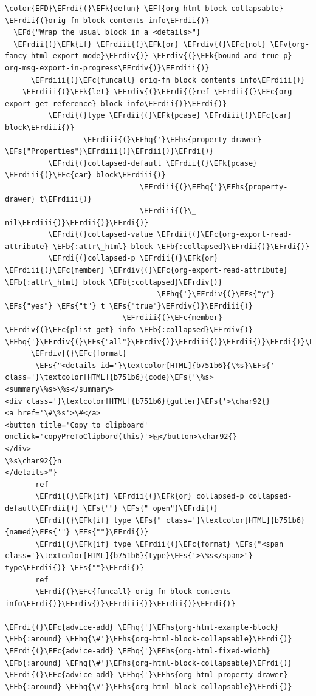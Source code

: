 \documentclass{scrartcl}
\newcommand{\EFk}[1]{\textcolor{EFk}{#1}} %
\newcommand{\EFd}[1]{\textcolor{EFd}{\textit{#1}}} %
\newcommand{\EFs}[1]{\textcolor{EFs}{#1}} %
\newcommand{\EFb}[1]{\textcolor{EFb}{#1}} %
\newcommand{\EFc}[1]{\textcolor{EFc}{#1}} %
\newcommand{\EFv}[1]{\textcolor{EFv}{#1}} %
\newcommand{\EFf}[1]{\textcolor{EFf}{#1}} %
\newcommand{\EFhq}[1]{\textcolor{EFhq}{#1}} %
\newcommand{\EFhs}[1]{\textcolor{EFhs}{#1}} %
\newcommand{\EFrdi}[1]{\textcolor{EFrdi}{#1}} %
\newcommand{\EFrdii}[1]{\textcolor{EFrdii}{#1}} %
\newcommand{\EFrdiii}[1]{\textcolor{EFrdiii}{#1}} %
\newcommand{\EFrdiv}[1]{\textcolor{EFrdiv}{#1}} %
\begin{document}
\begin{Code}
\begin{Verbatim}[]
\color{EFD}\EFrdi{(}\EFk{defun} \EFf{org-html-block-collapsable} \EFrdii{(}orig-fn block contents info\EFrdii{)}
  \EFd{"Wrap the usual block in a <details>"}
  \EFrdii{(}\EFk{if} \EFrdiii{(}\EFk{or} \EFrdiv{(}\EFc{not} \EFv{org-fancy-html-export-mode}\EFrdiv{)} \EFrdiv{(}\EFk{bound-and-true-p} org-msg-export-in-progress\EFrdiv{)}\EFrdiii{)}
      \EFrdiii{(}\EFc{funcall} orig-fn block contents info\EFrdiii{)}
    \EFrdiii{(}\EFk{let} \EFrdiv{(}\EFrdi{(}ref \EFrdii{(}\EFc{org-export-get-reference} block info\EFrdii{)}\EFrdi{)}
          \EFrdi{(}type \EFrdii{(}\EFk{pcase} \EFrdiii{(}\EFc{car} block\EFrdiii{)}
                  \EFrdiii{(}\EFhq{'}\EFhs{property-drawer} \EFs{"Properties"}\EFrdiii{)}\EFrdii{)}\EFrdi{)}
          \EFrdi{(}collapsed-default \EFrdii{(}\EFk{pcase} \EFrdiii{(}\EFc{car} block\EFrdiii{)}
                               \EFrdiii{(}\EFhq{'}\EFhs{property-drawer} t\EFrdiii{)}
                               \EFrdiii{(}\_ nil\EFrdiii{)}\EFrdii{)}\EFrdi{)}
          \EFrdi{(}collapsed-value \EFrdii{(}\EFc{org-export-read-attribute} \EFb{:attr\_html} block \EFb{:collapsed}\EFrdii{)}\EFrdi{)}
          \EFrdi{(}collapsed-p \EFrdii{(}\EFk{or} \EFrdiii{(}\EFc{member} \EFrdiv{(}\EFc{org-export-read-attribute} \EFb{:attr\_html} block \EFb{:collapsed}\EFrdiv{)}
                                   \EFhq{'}\EFrdiv{(}\EFs{"y"} \EFs{"yes"} \EFs{"t"} t \EFs{"true"}\EFrdiv{)}\EFrdiii{)}
                           \EFrdiii{(}\EFc{member} \EFrdiv{(}\EFc{plist-get} info \EFb{:collapsed}\EFrdiv{)} \EFhq{'}\EFrdiv{(}\EFs{"all"}\EFrdiv{)}\EFrdiii{)}\EFrdii{)}\EFrdi{)}\EFrdiv{)}
      \EFrdiv{(}\EFc{format}
       \EFs{"<details id='}\textcolor[HTML]{b751b6}{\%s}\EFs{' class='}\textcolor[HTML]{b751b6}{code}\EFs{'\%s>
<summary\%s>\%s</summary>
<div class='}\textcolor[HTML]{b751b6}{gutter}\EFs{'>\char92{}
<a href='\#\%s'>\#</a>
<button title='Copy to clipboard' onclick='copyPreToClipbord(this)'>⎘</button>\char92{}
</div>
\%s\char92{}n
</details>"}
       ref
       \EFrdi{(}\EFk{if} \EFrdii{(}\EFk{or} collapsed-p collapsed-default\EFrdii{)} \EFs{""} \EFs{" open"}\EFrdi{)}
       \EFrdi{(}\EFk{if} type \EFs{" class='}\textcolor[HTML]{b751b6}{named}\EFs{'"} \EFs{""}\EFrdi{)}
       \EFrdi{(}\EFk{if} type \EFrdii{(}\EFc{format} \EFs{"<span class='}\textcolor[HTML]{b751b6}{type}\EFs{'>\%s</span>"} type\EFrdii{)} \EFs{""}\EFrdi{)}
       ref
       \EFrdi{(}\EFc{funcall} orig-fn block contents info\EFrdi{)}\EFrdiv{)}\EFrdiii{)}\EFrdii{)}\EFrdi{)}

\EFrdi{(}\EFc{advice-add} \EFhq{'}\EFhs{org-html-example-block}   \EFb{:around} \EFhq{\#'}\EFhs{org-html-block-collapsable}\EFrdi{)}
\EFrdi{(}\EFc{advice-add} \EFhq{'}\EFhs{org-html-fixed-width}     \EFb{:around} \EFhq{\#'}\EFhs{org-html-block-collapsable}\EFrdi{)}
\EFrdi{(}\EFc{advice-add} \EFhq{'}\EFhs{org-html-property-drawer} \EFb{:around} \EFhq{\#'}\EFhs{org-html-block-collapsable}\EFrdi{)}
\end{Verbatim}
\end{Code}
\end{document}
